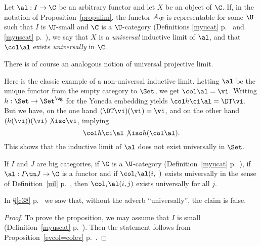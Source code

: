 \documentclass[12pt]{article}
\theoremstyle{remark}
\theoremstyle{definition}
\begin{document}
\begin{df} 
Let $\al:I\to\C$ be an arbitrary functor and let $X$ be an object of $\C$. If, in the notation of Proposition~\ref{propulim}, the functor $A_\U$ is representable for some $\U$ such that $I$ is $\U$-small and $\C$ is a $\U$-category (Definitions \ref{myucat} p.~ and \ref{myuscat} p.~), we say that $X$ is a {\em universal} inductive limit of $\al$, and that $\col\al$ exists {\em universally} in $\C$.
\end{df}

There is of course an analogous notion of universal projective limit. 

Here is the classic example of a non-universal inductive limit. Letting $\al$ be the unique functor from the empty category to $\Set$, we get $\col\al=\vi$. Writing $h:\Set\to\Set^\wg$ for the Yoneda embedding yields $\col h\ci\al=\DT\vi$. But we have, on the one hand $(\DT\vi)(\vi)=\vi$, and on the other hand $(h(\vi))(\vi)\not\iso\vi$, implying 
$$
\col h\ci\al\not\iso h(\col\al).
$$ 
This shows that the inductive limit of $\al$ does not exist universally in $\Set$.



\begin{s}
\begin{prop}
If $I$ and $J$ are big categories, if $\C$ is a $\U$-category (Definition~\ref{myucat} p.~), if $\al:I\tm J\to\C$ is a functor and if $\col_i\al(i,\ )$ exists universally in the sense of Definition~\ref{uil} p.~, then $\col_i\al(i,j)$ exists universally for all $j$. 
\end{prop}
In \S\ref{c38} p.~ we saw that, without the adverb ``universally'', the claim is false.
\begin{proof}
To prove the proposition, we may assume that $I$ is small (Definition~\ref{myuscat} p.~). %
Then the statement follows from Proposition~\ref{evcol=colev} p.~.
\end{proof}
\end{s}
\end{document}
